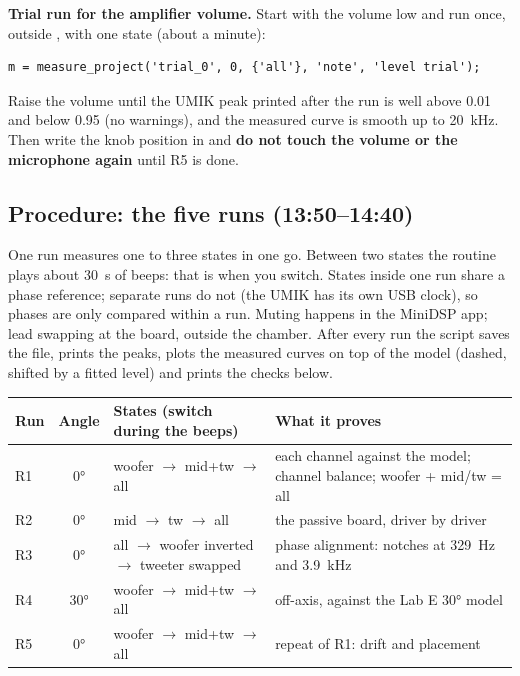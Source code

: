 \documentclass[a4paper,10pt]{article}
\newcommand{\file}[1]{\texttt{\detokenize{#1}}}
\newcommand{\cmd}[1]{\texttt{\detokenize{#1}}}
\begin{document}
\textbf{Trial run for the amplifier volume.} Start with the volume low and run once, outside
\file{project_run.m}, with one state (about a minute):
\begin{Verbatim}[fontsize=\small,frame=single,framesep=2mm]
m = measure_project('trial_0', 0, {'all'}, 'note', 'level trial');
\end{Verbatim}
Raise the volume until the UMIK peak printed after the run is well above 0.01 and below 0.95 (no
warnings), and the measured curve is smooth up to \SI{20}{kHz}. Then write the knob position in
\cmd{d.amp_volume} and \textbf{do not touch the volume or the microphone again} until R5 is done.

\subsection{Procedure: the five runs (13:50--14:40)}

One run measures one to three states in one go. Between two states the routine plays about
\SI{30}{s} of beeps: that is when you switch. States inside one run share a phase reference; separate
runs do not (the UMIK has its own USB clock), so phases are only compared within a run. Muting happens in
the MiniDSP app; lead swapping at the board, outside the chamber. After every run the script saves the
file, prints the peaks, plots the measured curves on top of the model (dashed, shifted by a fitted level)
and prints the checks below.

\begin{table}[H]
\centering\small
\begin{tabularx}{\textwidth}{@{}l c l L@{}}
\toprule
Run & Angle & States (switch during the beeps) & What it proves \\
\midrule
R1 & \ang{0} & woofer $\to$ mid+tw $\to$ all & each channel against the model; channel balance; woofer + mid/tw = all \\
R2 & \ang{0} & mid $\to$ tw $\to$ all & the passive board, driver by driver \\
R3 & \ang{0} & all $\to$ woofer inverted $\to$ tweeter swapped & phase alignment: notches at \SI{329}{Hz} and \SI{3.9}{kHz} \\
R4 & \ang{30} & woofer $\to$ mid+tw $\to$ all & off-axis, against the Lab E \ang{30} model \\
R5 & \ang{0} & woofer $\to$ mid+tw $\to$ all & repeat of R1: drift and placement \\
\bottomrule
\end{tabularx}
\end{table}
\end{document}
